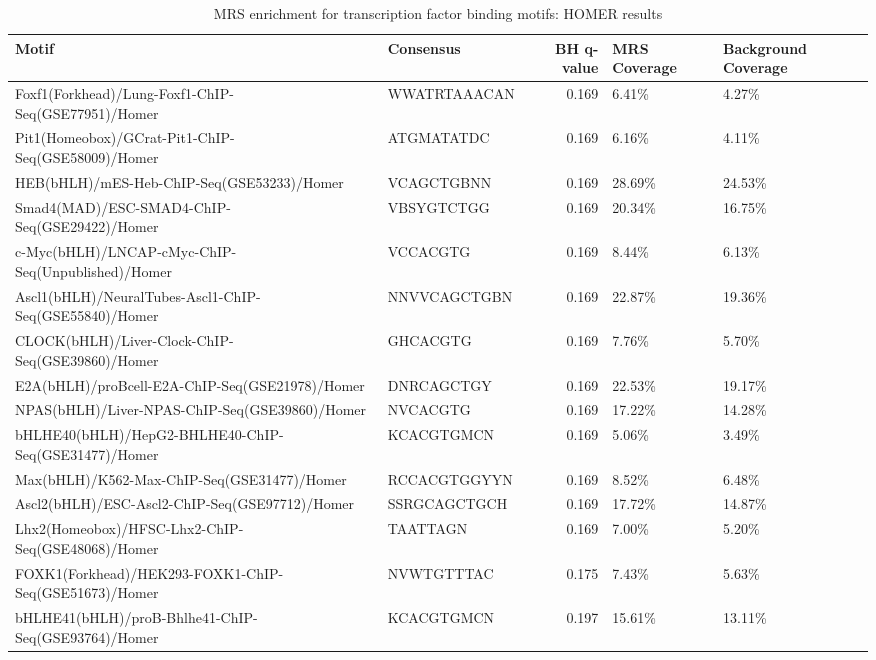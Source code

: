 \documentclass[]{article}
\begin{document}
\begin{table}[t]

\caption{\label{tab:tf-enrichment}MRS enrichment for transcription factor binding motifs: HOMER results}
\centering
\begin{tabular}{>{\raggedright\arraybackslash}p{15em}lrll}
\toprule
Motif & Consensus & BH q-value & MRS Coverage & Background Coverage\\
\midrule
Foxf1(Forkhead)/Lung-Foxf1-ChIP-Seq(GSE77951)/Homer & WWATRTAAACAN & 0.169 & 6.41\% & 4.27\%\\
Pit1(Homeobox)/GCrat-Pit1-ChIP-Seq(GSE58009)/Homer & ATGMATATDC & 0.169 & 6.16\% & 4.11\%\\
HEB(bHLH)/mES-Heb-ChIP-Seq(GSE53233)/Homer & VCAGCTGBNN & 0.169 & 28.69\% & 24.53\%\\
Smad4(MAD)/ESC-SMAD4-ChIP-Seq(GSE29422)/Homer & VBSYGTCTGG & 0.169 & 20.34\% & 16.75\%\\
c-Myc(bHLH)/LNCAP-cMyc-ChIP-Seq(Unpublished)/Homer & VCCACGTG & 0.169 & 8.44\% & 6.13\%\\
\addlinespace
Ascl1(bHLH)/NeuralTubes-Ascl1-ChIP-Seq(GSE55840)/Homer & NNVVCAGCTGBN & 0.169 & 22.87\% & 19.36\%\\
CLOCK(bHLH)/Liver-Clock-ChIP-Seq(GSE39860)/Homer & GHCACGTG & 0.169 & 7.76\% & 5.70\%\\
E2A(bHLH)/proBcell-E2A-ChIP-Seq(GSE21978)/Homer & DNRCAGCTGY & 0.169 & 22.53\% & 19.17\%\\
NPAS(bHLH)/Liver-NPAS-ChIP-Seq(GSE39860)/Homer & NVCACGTG & 0.169 & 17.22\% & 14.28\%\\
bHLHE40(bHLH)/HepG2-BHLHE40-ChIP-Seq(GSE31477)/Homer & KCACGTGMCN & 0.169 & 5.06\% & 3.49\%\\
\addlinespace
Max(bHLH)/K562-Max-ChIP-Seq(GSE31477)/Homer & RCCACGTGGYYN & 0.169 & 8.52\% & 6.48\%\\
Ascl2(bHLH)/ESC-Ascl2-ChIP-Seq(GSE97712)/Homer & SSRGCAGCTGCH & 0.169 & 17.72\% & 14.87\%\\
Lhx2(Homeobox)/HFSC-Lhx2-ChIP-Seq(GSE48068)/Homer & TAATTAGN & 0.169 & 7.00\% & 5.20\%\\
FOXK1(Forkhead)/HEK293-FOXK1-ChIP-Seq(GSE51673)/Homer & NVWTGTTTAC & 0.175 & 7.43\% & 5.63\%\\
bHLHE41(bHLH)/proB-Bhlhe41-ChIP-Seq(GSE93764)/Homer & KCACGTGMCN & 0.197 & 15.61\% & 13.11\%\\
\bottomrule
\end{tabular}
\end{table}
\end{document}
